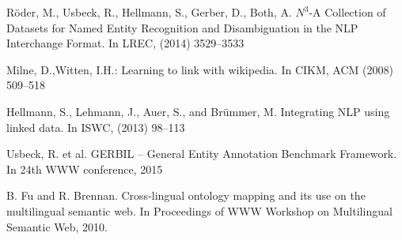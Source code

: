 \documentclass{llncs}
\begin{document}
\begin{thebibliography}{99}
Röder, M., Usbeck, R., Hellmann, S., Gerber, D., Both, A. $N^3$-{A} Collection of Datasets for Named Entity Recognition and Disambiguation in the NLP Interchange Format. In LREC, (2014) 3529--3533

Milne, D.,Witten, I.H.: Learning to link with wikipedia. In CIKM, ACM (2008) 509--518

Hellmann, S., Lehmann, J., Auer, S., and Br\"ummer, M. Integrating NLP using linked data. In ISWC, (2013) 98–113

Usbeck, R. et al. GERBIL -- General Entity Annotation Benchmark Framework. In 24th WWW conference, 2015

B. Fu and R. Brennan. Cross-lingual ontology mapping and its use on the multilingual semantic web. In Proceedings of WWW Workshop on Multilingual Semantic Web, 2010.


\begin{comment}
\begin{table}[tb!]
\centering
\caption{My caption}
\label{my-label}
\begin{tabular}{@{}lcccccccccc@{}}
\toprule
            & \multicolumn{2}{c}{DE} & \multicolumn{2}{c}{EN} & \multicolumn{2}{c}{ES} & \multicolumn{2}{c}{FR} & \multicolumn{2}{c}{IT} \\ \midrule
            &~~~$R$~~~  &~~~$S$~~~   &~~~$R$~~~  &~~~$S$~~~   &~~~$R$~~~  &~~~$S$~~~   &~~~$R$~~~  &~~~$S$~~~   &~~~$R$~~~  &~~~$S$~~~    
            \\ \cmidrule(lr){2-3}\cmidrule(lr){4-5}\cmidrule(lr){6-7}\cmidrule(lr){8-9}\cmidrule(lr){10-11} 
Babelfy$_r$ & 0.595   & 0.784   & 0.578   & 0.759  & 0.662  & 0.805   & 0.613   & 0.739  & 0.579   & 0.706        \\
Babelfy$_s$ & 0.301   & 0.701   & 0.336   & 0.638  & 0.342  & 0.722   & 0.328   & 0.697  & 0.316   & 0.334        \\
AGDISTIS    & 0.270   & 0.568   & 0.301   & 0.779  & 0.376  & 0.549   & 0.241   & 0.475  & 0.447   & 0.725        \\
DBspot      & 0.600   & 0.641   & 0.650   & 0.706  & 0.506  & 0.492   & 0.466   & 0.512  & 0.569   & 0.651        \\
FREME-NER   & 0.err   & err     & 0.508   & 0.550  & err    & err     & err     & err    & err     & err        \\
Tagme 2     & 0.340   & 0.747   & 0.592   & 0.857  & -      & -       & -       & -      & 0.266   & 0.604        \\
THD         & 0.194   & 0.500   & 0.386   & 0.719  & -      & -       & -       & -      & -       & -          \\ \bottomrule
\end{tabular}
\end{table}




\end{comment}
\end{thebibliography}
\end{document}
